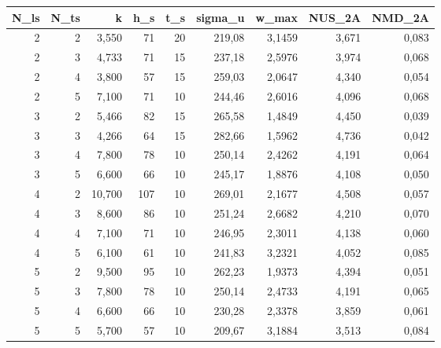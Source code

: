 \begin{tabular}{rrrrrrrrr}
\toprule
N_ls & N_ts & k & h_s & t_s & sigma_u & w_max & NUS_2A & NMD_2A \\ \hline
\midrule
2 & 2 & 3,550 & 71 & 20 & 219,08 & 3,1459 & 3,671 & 0,083 \\ \hline
2 & 3 & 4,733 & 71 & 15 & 237,18 & 2,5976 & 3,974 & 0,068 \\ \hline
2 & 4 & 3,800 & 57 & 15 & 259,03 & 2,0647 & 4,340 & 0,054 \\ \hline
2 & 5 & 7,100 & 71 & 10 & 244,46 & 2,6016 & 4,096 & 0,068 \\ \hline
3 & 2 & 5,466 & 82 & 15 & 265,58 & 1,4849 & 4,450 & 0,039 \\ \hline
3 & 3 & 4,266 & 64 & 15 & 282,66 & 1,5962 & 4,736 & 0,042 \\ \hline
3 & 4 & 7,800 & 78 & 10 & 250,14 & 2,4262 & 4,191 & 0,064 \\ \hline
3 & 5 & 6,600 & 66 & 10 & 245,17 & 1,8876 & 4,108 & 0,050 \\ \hline
4 & 2 & 10,700 & 107 & 10 & 269,01 & 2,1677 & 4,508 & 0,057 \\ \hline
4 & 3 & 8,600 & 86 & 10 & 251,24 & 2,6682 & 4,210 & 0,070 \\ \hline
4 & 4 & 7,100 & 71 & 10 & 246,95 & 2,3011 & 4,138 & 0,060 \\ \hline
4 & 5 & 6,100 & 61 & 10 & 241,83 & 3,2321 & 4,052 & 0,085 \\ \hline
5 & 2 & 9,500 & 95 & 10 & 262,23 & 1,9373 & 4,394 & 0,051 \\ \hline
5 & 3 & 7,800 & 78 & 10 & 250,14 & 2,4733 & 4,191 & 0,065 \\ \hline
5 & 4 & 6,600 & 66 & 10 & 230,28 & 2,3378 & 3,859 & 0,061 \\ \hline
5 & 5 & 5,700 & 57 & 10 & 209,67 & 3,1884 & 3,513 & 0,084 \\ \hline
\bottomrule
\end{tabular}

